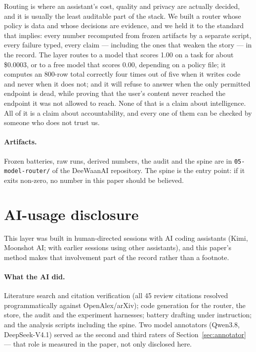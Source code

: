 \documentclass[11pt]{article}
\newcommand{\code}[1]{\texttt{#1}}
\begin{document}
Routing is where an assistant's cost, quality and privacy are actually decided, and it is
usually the least auditable part of the stack. We built a router whose policy is data and whose
decisions are evidence, and we held it to the standard that implies: every number recomputed from
frozen artifacts by a separate script, every failure typed, every claim --- including the ones
that weaken the story --- in the record. The layer routes to a model that scores 1.00 on a task
for about \$0.0003, or to a free model that scores 0.00, depending on a policy file; it computes an
800-row total correctly four times out of five when it writes code and never when it does not;
and it will refuse to answer when the only permitted endpoint is dead, while proving that the
user's content never reached the endpoint it was not allowed to reach. None of that is a claim
about intelligence. All of it is a claim about accountability, and every one of them can be
checked by someone who does not trust us.

\paragraph{Artifacts.} Frozen batteries, raw runs, derived numbers, the audit and the spine are in
\code{05-model-router/} of the DeeWaanAI repository. The spine is the entry point: if it exits
non-zero, no number in this paper should be believed.

\section*{AI-usage disclosure}

This layer was built in human-directed sessions with AI coding assistants (Kimi, Moonshot AI;
with earlier sessions using other assistants), and this paper's method makes that involvement
part of the record rather than a footnote.

\paragraph{What the AI did.} Literature search and citation verification (all 45 review
citations resolved programmatically against OpenAlex/arXiv); code generation for the router, the
store, the audit and the experiment harnesses; battery drafting under instruction; and the
analysis scripts including the spine. Two model annotators (Qwen3.8, DeepSeek-V4.1) served as
the second and third raters of Section~\ref{sec:annotator} --- that role is measured in the
paper, not only disclosed here.
\end{document}
